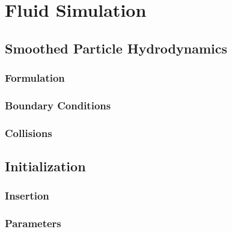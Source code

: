 \chapter{Fluid Simulation}

\section{Smoothed Particle Hydrodynamics}
\subsection{Formulation}
\subsection{Boundary Conditions}
\subsection{Collisions}


\section{Initialization}
\subsection{Insertion}
\subsection{Parameters}



